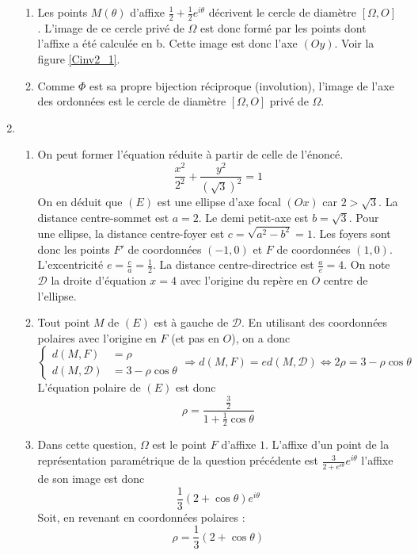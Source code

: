 \begin{enumerate}
\begin{enumerate}
\item Les points $M(\theta)$ d'affixe $\frac{1}{2}+\frac{1}{2}e^{i\theta}$ décrivent le cercle de diamètre $[\Omega, O]$. L'image de ce cercle privé de $\Omega$ est donc formé par les points dont l'affixe a été calculée en b. Cette image est donc l'axe $(Oy)$. Voir la figure \ref{Cinv2_1}. 
\item Comme $\Phi$ est sa propre bijection réciproque (involution), l'image de l'axe des ordonnées est le cercle de diamètre $[\Omega, O]$ privé de $\Omega$.
\end{enumerate}
\item \begin{enumerate}
 \item On peut former l'équation réduite à partir de celle de l'énoncé.
\begin{displaymath}
 \dfrac{x^2}{2^2}+\dfrac{y^2}{(\sqrt{3})^2}=1
\end{displaymath}
 On en déduit que $(E)$ est une ellipse d'axe focal $(Ox)$ car $2>\sqrt{3}$. La distance centre-sommet est $a=2$. Le demi petit-axe est $b=\sqrt{3}$. Pour une ellipse, la distance centre-foyer est $c=\sqrt{a^2-b^2}=1$. Les foyers sont donc les points $F'$ de coordonnées $(-1,0)$ et $F$ de coordonnées $(1,0)$. L'excentricité $e=\frac{c}{a}=\frac{1}{2}$. La distance centre-directrice est $\frac{a}{e}=4$. On note $\mathcal D$ la droite d'équation $x=4$ avec l'origine du repère en $O$ centre de l'ellipse.
\item Tout point $M$ de $(E)$ est à gauche de $\mathcal D$. En utilisant des coordonnées polaires avec l'origine en $F$ (et pas en $O$), on a donc
\begin{displaymath}
 \left\lbrace 
\begin{aligned}
d(M,F) &= \rho\\
d(M,\mathcal D) &= 3-\rho\cos\theta 
\end{aligned}
\right. \Rightarrow d(M,F)=ed(M,\mathcal D) \Leftrightarrow 2\rho=3-\rho\cos \theta 
\end{displaymath}
L'équation polaire de $(E)$ est donc
\begin{displaymath}
 \rho = \dfrac{\frac{3}{2}}{1+\frac{1}{2}\cos\theta}
\end{displaymath}

\item Dans cette question, $\Omega$ est le point $F$ d'affixe $1$. L'affixe d'un point de la représentation paramétrique de la question précédente est $\frac{3}{2+e^{i\theta}}e^{i\theta}$ l'affixe de son image est donc 
\begin{displaymath}
 \dfrac{1}{3}(2+\cos \theta)e^{i\theta}
\end{displaymath}
Soit, en revenant en coordonnées polaires :
\begin{displaymath}
\rho= \dfrac{1}{3}(2+\cos \theta)
\end{displaymath}
\end{enumerate}


\end{enumerate}
